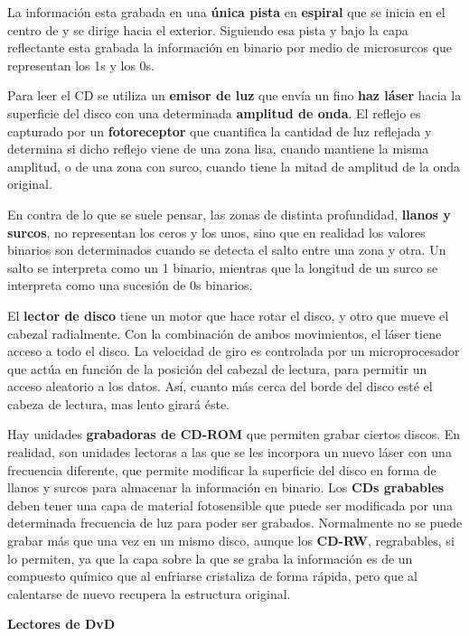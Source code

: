 \begin{itemize}
\begin{itemize}
    La información esta grabada en una \textbf{única pista} en \textbf{espiral} que se inicia en el centro de y se dirige hacia el exterior. Siguiendo esa pista y bajo la capa reflectante esta grabada la información en binario por medio de microsurcos que representan los 1s y los 0s.

    Para leer el CD se utiliza un \textbf{emisor de luz} que envía un fino \textbf{haz láser} hacia la superficie del disco con una determinada \textbf{amplitud de onda}. El reflejo es capturado por un \textbf{fotoreceptor} que cuantifica la cantidad de luz reflejada y determina si dicho reflejo viene de una zona lisa, cuando mantiene la misma amplitud, o de una zona con surco, cuando tiene la mitad de amplitud de la onda original.

    En contra de lo que se suele pensar, las zonas de distinta profundidad, \textbf{llanos y surcos}, no representan los ceros y los unos, sino que en realidad los valores binarios son determinados cuando se detecta el salto entre una zona y otra. Un salto se interpreta como un 1 binario, mientras que la longitud de un surco se interpreta como una sucesión de 0s binarios.

    El \textbf{lector de disco} tiene un motor que hace rotar el disco, y otro que mueve el cabezal radialmente. Con la combinación de ambos movimientos, el láser tiene acceso a todo el disco. La velocidad de giro es controlada por un microprocesador que actúa en función de la posición del cabezal de lectura, para permitir un acceso aleatorio a los datos. Así, cuanto más cerca del borde del disco esté el cabeza de lectura, mas lento girará éste.

    Hay unidades \textbf{grabadoras de CD-ROM} que permiten grabar ciertos discos. En realidad, son unidades lectoras a las que se les incorpora un nuevo láser con una frecuencia diferente, que permite modificar la superficie del disco en forma de llanos y surcos para almacenar la información en binario. Los \textbf{CDs grabables} deben tener una capa de material fotosensible que puede ser modificada por una determinada frecuencia de luz para poder ser grabados. Normalmente no se puede grabar más que una vez en un mismo disco, aunque los \textbf{CD-RW}, regrabables, si lo permiten, ya que la capa sobre la que se graba la información es de un compuesto químico que al enfriarse cristaliza de forma rápida, pero que al calentarse de nuevo recupera la estructura original.
    \end{itemize}

    \textbf{Lectores de DvD}
\end{itemize}













\glsaddall
\printglossaries


\newpage
{}



